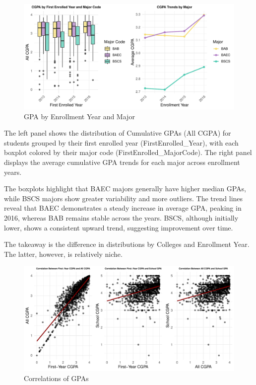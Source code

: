 \documentclass[
  12pt,
]{article}
\begin{document}
\newpage

\begin{figure}
\includegraphics[width=0.9\linewidth]{iesm315_report_files/figure-latex/unnamed-chunk-15-1} \caption{GPA by Enrollment Year and Major}\label{fig:unnamed-chunk-15}
\end{figure}

The left panel shows the distribution of Cumulative GPAs (All CGPA) for
students grouped by their first enrolled year (FirstEnrolled\_Year),
with each boxplot colored by their major code
(FirstEnrolled\_MajorCode). The right panel displays the average
cumulative GPA trends for each major across enrollment years.

The boxplots highlight that BAEC majors generally have higher median
GPAs, while BSCS majors show greater variability and more outliers. The
trend lines reveal that BAEC demonstrates a steady increase in average
GPA, peaking in 2016, whereas BAB remains stable across the years. BSCS,
although initially lower, shows a consistent upward trend, suggesting
improvement over time.

The takeaway is the difference in distributions by Colleges and
Enrollment Year. The latter, however, is relatively niche.

\newpage

\begin{figure}
\includegraphics[width=0.9\linewidth]{iesm315_report_files/figure-latex/unnamed-chunk-16-1} \caption{Correlations of GPAs}\label{fig:unnamed-chunk-16}
\end{figure}
\end{document}
